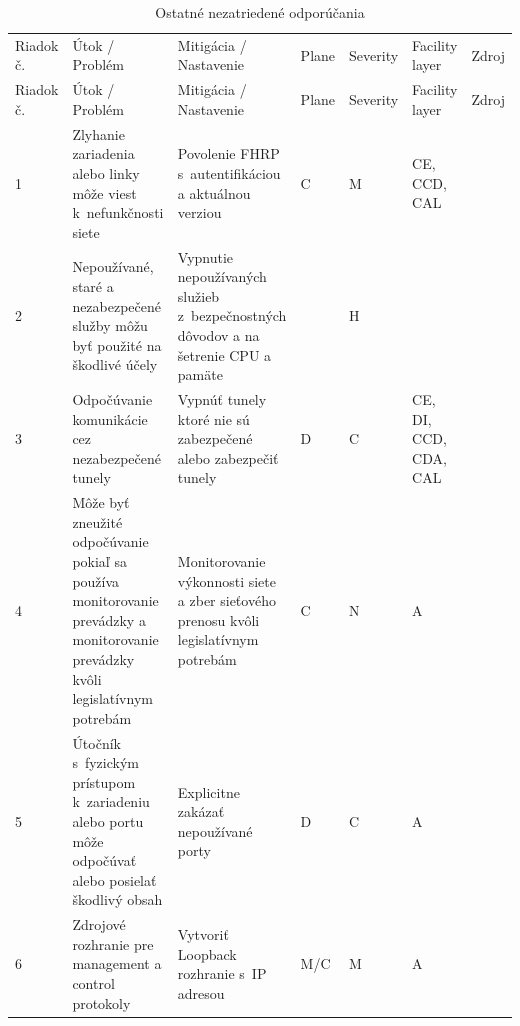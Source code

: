 \begin{longtable}[!htbp]{|C{2.5em}L{11em}L{11em}C{2.5em}C{4em}C{5em}L{2.5em}|}
	
	\caption{Ostatné nezatriedené odporúčania}
	\label{tab:other}\\ \hline
	\mbox{Riadok} č.&Útok / Problém	&Mitigácia / Nastavenie	&Plane	&Severity	&Facility layer	&Zdroj\\ \hhline{=======}
	\endfirsthead 
	\hline
	\centering
	
	Riadok č.	&Útok / Problém	&Mitigácia / Nastavenie	&Plane	&Severity	&Facility layer	&Zdroj\\ \hhline{=======}
	\endhead
	
	 1	&Zlyhanie zariadenia alebo linky môže viest k~nefunkčnosti siete 	&Povolenie FHRP s~autentifikáciou a aktuálnou verziou	&C	&M	&CE,
	CCD,
	CAL	& \cite{Lammle2013}\\
	2	&Nepoužívané, staré a nezabezpečené služby môžu byť použité na škodlivé účely	&Vypnutie nepoužívaných služieb z~bezpečnostných dôvodov a na šetrenie CPU a pamäte 	& {\normalsize*}\footnotemark &H	&{\normalsize*}\footnotemark[\value{footnote}] & \cite{yDzYjF1hoACahpg1}\\
	 3	&Odpočúvanie komunikácie  cez nezabezpečené tunely	&Vypnúť tunely ktoré nie sú zabezpečené alebo zabezpečiť tunely	&D	&C	&CE, DI, CCD, CDA, CAL	& \cite{CIS_DrTLsgXv24lxeIIM}
	
	\cite{Hucaby2010}\\
	4	&Môže byť zneužité odpočúvanie pokiaľ sa používa monitorovanie prevádzky a monitorovanie prevádzky kvôli legislatívnym potrebám	&Monitorovanie výkonnosti siete a zber sieťového prenosu kvôli legislatívnym potrebám	&C	&N	&A	& \cite{Singh2018}\\
	 5	&Útočník s~fyzickým prístupom k~zariadeniu alebo portu môže odpočúvať alebo posielať škodlivý obsah	&Explicitne zakázať nepoužívané porty	&D	&C	&A	& \cite{Graesser2001}
	
	\cite{Jackson2010}\\
	6	&Zdrojové rozhranie pre management a control protokoly	&Vytvoriť Loopback rozhranie s~IP adresou	&M/C	&M	&A	&
	\cite{Singh2018}
	

\end{longtable}
